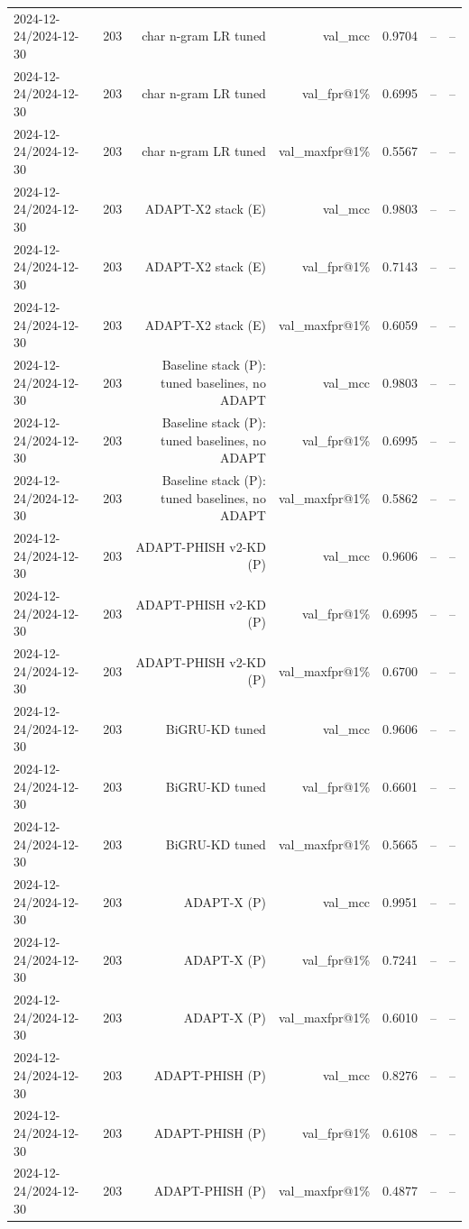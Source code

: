 \begin{table}[t]
\begin{tabular}{llrrrrr}
2024-12-24/2024-12-30 & 203 & char n-gram LR tuned & val\_mcc & 0.9704 & -- & -- \\
2024-12-24/2024-12-30 & 203 & char n-gram LR tuned & val\_fpr@1\% & 0.6995 & -- & -- \\
2024-12-24/2024-12-30 & 203 & char n-gram LR tuned & val\_maxfpr@1\% & 0.5567 & -- & -- \\
2024-12-24/2024-12-30 & 203 & ADAPT-X2 stack (E) & val\_mcc & 0.9803 & -- & -- \\
2024-12-24/2024-12-30 & 203 & ADAPT-X2 stack (E) & val\_fpr@1\% & 0.7143 & -- & -- \\
2024-12-24/2024-12-30 & 203 & ADAPT-X2 stack (E) & val\_maxfpr@1\% & 0.6059 & -- & -- \\
2024-12-24/2024-12-30 & 203 & Baseline stack (P): tuned baselines, no ADAPT & val\_mcc & 0.9803 & -- & -- \\
2024-12-24/2024-12-30 & 203 & Baseline stack (P): tuned baselines, no ADAPT & val\_fpr@1\% & 0.6995 & -- & -- \\
2024-12-24/2024-12-30 & 203 & Baseline stack (P): tuned baselines, no ADAPT & val\_maxfpr@1\% & 0.5862 & -- & -- \\
2024-12-24/2024-12-30 & 203 & ADAPT-PHISH v2-KD (P) & val\_mcc & 0.9606 & -- & -- \\
2024-12-24/2024-12-30 & 203 & ADAPT-PHISH v2-KD (P) & val\_fpr@1\% & 0.6995 & -- & -- \\
2024-12-24/2024-12-30 & 203 & ADAPT-PHISH v2-KD (P) & val\_maxfpr@1\% & 0.6700 & -- & -- \\
2024-12-24/2024-12-30 & 203 & BiGRU-KD tuned & val\_mcc & 0.9606 & -- & -- \\
2024-12-24/2024-12-30 & 203 & BiGRU-KD tuned & val\_fpr@1\% & 0.6601 & -- & -- \\
2024-12-24/2024-12-30 & 203 & BiGRU-KD tuned & val\_maxfpr@1\% & 0.5665 & -- & -- \\
2024-12-24/2024-12-30 & 203 & ADAPT-X (P) & val\_mcc & 0.9951 & -- & -- \\
2024-12-24/2024-12-30 & 203 & ADAPT-X (P) & val\_fpr@1\% & 0.7241 & -- & -- \\
2024-12-24/2024-12-30 & 203 & ADAPT-X (P) & val\_maxfpr@1\% & 0.6010 & -- & -- \\
2024-12-24/2024-12-30 & 203 & ADAPT-PHISH (P) & val\_mcc & 0.8276 & -- & -- \\
2024-12-24/2024-12-30 & 203 & ADAPT-PHISH (P) & val\_fpr@1\% & 0.6108 & -- & -- \\
2024-12-24/2024-12-30 & 203 & ADAPT-PHISH (P) & val\_maxfpr@1\% & 0.4877 & -- & -- \\

\end{tabular}
\end{table}
